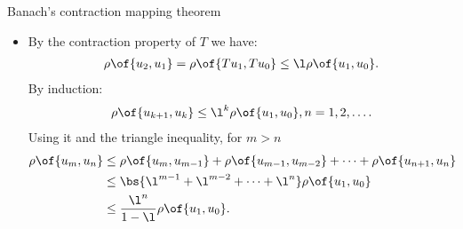 \documentclass[11pt,xcolor={dvipsnames},aspectratio=159,hyperref={pdftex,pdfpagemode=UseNone,hidelinks,pdfdisplaydoctitle=true},usepdftitle=false]{beamer}
\begin{document}
\begin{frame}{Banach's contraction mapping theorem}
\begin{itemize}
    \item By the contraction property of $T$ we have: \begin{align*}
        \rho\of{u_2,u_1} = \rho\of{Tu_1,Tu_0}  \leq \l \rho\of{u_1,u_0}.
    \end{align*}
    By induction: \begin{align*}
        \rho\of{u_{k+1},u_k} \leq \l^k \rho\of{u_1,u_0}, n = 1,2,\ldots.
    \end{align*}
    Using it and the triangle inequality, for $m>n$ \begin{align*}
        \rho\of{u_m,u_n} &\leq \rho\of{u_m,u_{m-1}} + \rho\of{u_{m-1},u_{m-2}} + \cdots + \rho\of{u_{n+1},u_n} \\ &
        \leq \bs{\l^{m-1}+\l^{m-2}+\cdots+\l^n} \rho\of{u_1,u_0} \\
        &\leq  \frac{\l^n}{1-\l} \rho\of{u_1,u_0}.
    \end{align*}
\end{itemize}
\end{frame}
\end{document}
